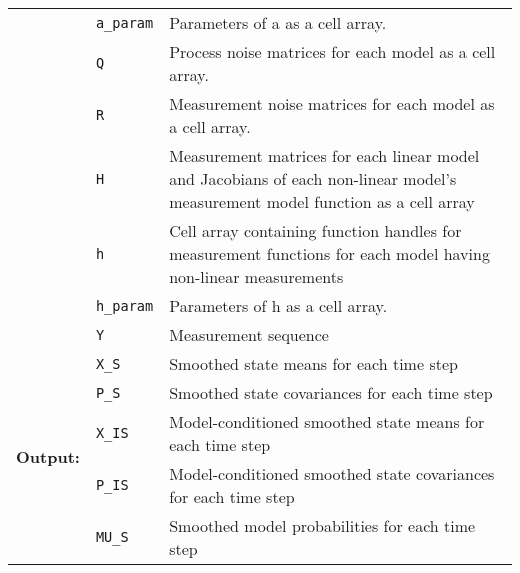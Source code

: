 \begin{tabular*}{\textwidth}{@{\extracolsep{\fill}} | l l p{} |  }
 & \texttt{a\_param} & Parameters of a as a cell array. \\
 & \texttt{Q} & Process noise matrices for each model as a cell array. \\
 & \texttt{R} & Measurement noise matrices for each model as a cell array. \\
 & \texttt{H} & Measurement matrices for each linear model and Jacobians of each
            non-linear model's measurement model function as a cell array \\
 & \texttt{h} & Cell array containing function handles for measurement functions
            for each model having non-linear measurements \\
 & \texttt{h\_param} & Parameters of h as a cell array. \\
 & \texttt{Y} & Measurement sequence \\
\hline
\multirow{5}{*}{\bf Output:}
 & \texttt{X\_S} & Smoothed state means for each time step \\
 & \texttt{P\_S} & Smoothed state covariances for each time step \\
 & \texttt{X\_IS} & Model-conditioned smoothed state means for each time step \\
 & \texttt{P\_IS} & Model-conditioned smoothed state covariances for each time step \\
 & \texttt{MU\_S} & Smoothed model probabilities for each time step
     \\
\hline
\end{tabular*}
